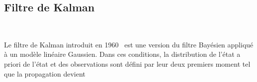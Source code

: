






\subsection{Filtre de Kalman}~\label{kalman_filter}

Le filtre de Kalman introduit en 1960~\cite{kalman_new_1960} est une version du filtre Bayésien appliqué à un modèle linéaire Gaussien. Dans ces conditions, la distribution de l'état a priori de l'état et des observations sont défini par leur deux premiers moment tel que la propagation devient

